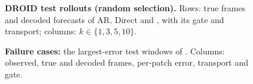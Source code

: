 \begin{figure}[tp]
  \centering
  \caption{\textbf{DROID test rollouts (random selection).} Rows: true frames and decoded forecasts of AR, Direct and
  \ours{}, with its gate and transport; columns: $k\in\{1,3,5,10\}$.}
  \label{fig:gallery-droid}
\end{figure}
\begin{figure}[tp]
  \centering
  \caption{\textbf{Failure cases:} the largest-error test windows of \ours{}. Columns: observed, true and decoded frames,
  per-patch error, transport and gate.}
  \label{fig:failures}
\end{figure}
